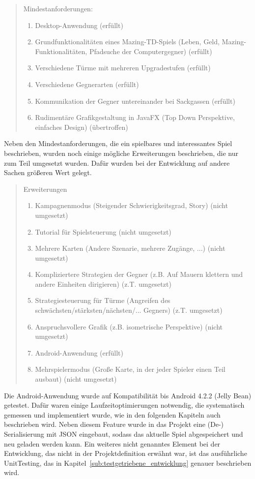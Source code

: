 \begin{quotation}
Mindestanforderungen:
\begin{enumerate}
	\item Desktop-Anwendung \textcolor{dkgreen}{(erfüllt)}
	\item Grundfunktionalitäten eines Mazing-TD-Spiels (Leben, Geld, Mazing-Funktionalitäten, Pfadsuche
	der Computergegner) \textcolor{dkgreen}{(erfüllt)}
	\item Verschiedene Türme mit mehreren Upgradestufen \textcolor{dkgreen}{(erfüllt)}
	\item Verschiedene Gegnerarten \textcolor{dkgreen}{(erfüllt)}
	\item Kommunikation der Gegner untereinander bei Sackgassen \textcolor{dkgreen}{(erfüllt)}
	\item Rudimentäre Grafikgestaltung in JavaFX (Top Down Perspektive, einfaches Design) \textcolor{dkgreen}{(übertroffen)}
	\end{enumerate}
\end{quotation}
Neben den Mindestanforderungen, die ein spielbares und interessantes Spiel beschrieben, wurden noch einige mögliche Erweiterungen beschrieben, die nur zum Teil umgesetzt wurden. Dafür wurden bei der Entwicklung auf andere Sachen größeren Wert gelegt. 
\begin{quotation}
Erweiterungen
\begin{enumerate}
	\item Kampagnenmodus (Steigender Schwierigkeitsgrad, Story) \textcolor{dkred}{(nicht umgesetzt)}
	\item Tutorial für Spielsteuerung \textcolor{dkred}{(nicht umgesetzt)}
	\item Mehrere Karten (Andere Szenarie, mehrere Zugänge, ...) \textcolor{dkred}{(nicht umgesetzt)}
	\item Kompliziertere Strategien der Gegner (z.B. Auf Mauern klettern und andere Einheiten dirigieren) \textcolor{dkgreen}{(z.T. umgesetzt)}
	\item Strategiesteuerung für Türme (Angreifen des schwächsten/stärksten/nächsten/... Gegners) \textcolor{dkgreen}{(z.T. umgesetzt)}
	\item Anspruchsvollere Grafik (z.B. isometrische Perspektive) \textcolor{dkred}{(nicht umgesetzt)}
	\item Android-Anwendung \textcolor{dkgreen}{(erfüllt)}
	\item Mehrspielermodus (Große Karte, in der jeder Spieler einen Teil ausbaut) \textcolor{dkred}{(nicht umgesetzt)}
\end{enumerate}
\end{quotation}
Die Android-Anwendung wurde auf Kompatibilität bis Android 4.2.2 (Jelly Bean) getestet. Dafür waren einige Laufzeitoptimierungen notwendig, die systematisch gemessen und implementiert wurde, wie in den folgenden Kapiteln auch beschrieben wird. Neben diesem Feature wurde in das Projekt eine (De-) Serialisierung mit JSON eingebaut, sodass das aktuelle Spiel abgespeichert und neu geladen werden kann. Ein weiteres nicht genanntes Element bei der Entwicklung, das nicht in der Projektdefinition erwähnt war, ist das ausführliche UnitTesting, das in Kapitel~\ref{sub:testgetriebene_entwicklung} genauer beschrieben wird. 
